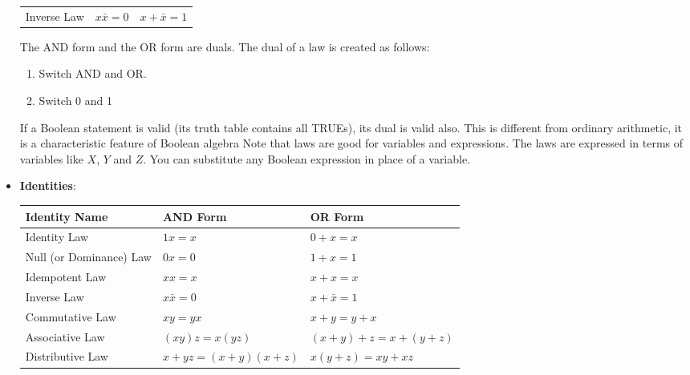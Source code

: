 \documentclass{report}
\begin{document}
\begin{itemize}
\begin{center}
\begin{tabular}{c|c|c}
                    Inverse Law & $x\bar{x} = 0$ & $x + \bar{x} = 1$
                \end{tabular}
            \end{center}
            \bigbreak \noindent 
            The AND form and the OR form are duals. The dual of a law is created as follows:
            \begin{enumerate}
                \item Switch AND and OR.
                \item Switch 0 and 1
            \end{enumerate}
            \bigbreak \noindent 
            If a Boolean statement is valid (its truth table contains all TRUEs), its dual is valid also. This is different from ordinary arithmetic, it is a characteristic feature of Boolean algebra
            \bigbreak \noindent 
            Note that laws are good for variables and expressions. 
            The laws are expressed in terms of variables like $X$, $Y$ and $Z$.
            \bigbreak \noindent 
            You can substitute any Boolean expression in place of a variable.
        \item \textbf{Identities}:
            \begin{center}
                \begin{tabular}{|l|l|l|}
                    \hline
                    \textbf{Identity Name}       & \textbf{AND Form}              & \textbf{OR Form} \\ \hline
                    Identity Law                 & $1x = x$                       & $0 + x = x$ \\ \hline
                    Null (or Dominance) Law      & $0x = 0$                       & $1 + x = 1$ \\ \hline
                    Idempotent Law               & $xx = x$                       & $x + x = x$ \\ \hline
                    Inverse Law                  & $x\bar{x} = 0$                 & $x + \bar{x} = 1$ \\ \hline
                    Commutative Law              & $xy = yx$                      & $x + y = y + x$ \\ \hline
                    Associative Law              & $(xy)z = x(yz)$                & $(x + y) + z = x + (y + z)$ \\ \hline
                    Distributive Law             & $x + yz = (x + y)(x + z)$      & $x(y + z) = xy + xz$ \\ \hline

\end{tabular}
\end{center}
\end{itemize}
\end{document}
